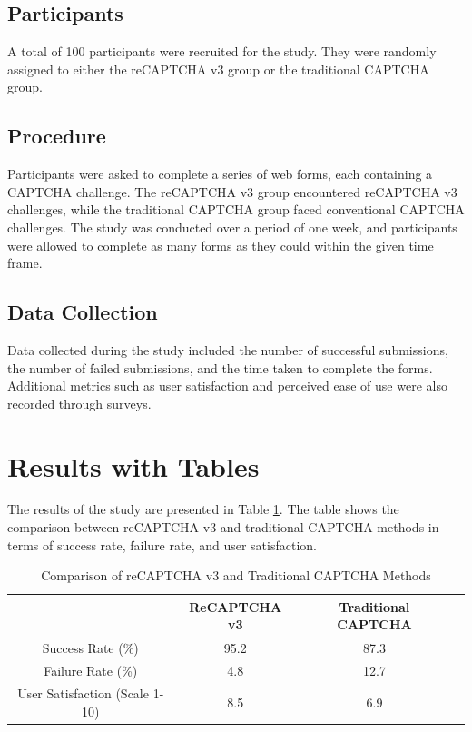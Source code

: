\documentclass{article}
\begin{document}
\subsection{Participants}
A total of 100 participants were recruited for the study. They were randomly assigned to either the reCAPTCHA v3 group or the traditional CAPTCHA group.

\subsection{Procedure}
Participants were asked to complete a series of web forms, each containing a CAPTCHA challenge. The reCAPTCHA v3 group encountered reCAPTCHA v3 challenges, while the traditional CAPTCHA group faced conventional CAPTCHA challenges. The study was conducted over a period of one week, and participants were allowed to complete as many forms as they could within the given time frame.

\subsection{Data Collection}
Data collected during the study included the number of successful submissions, the number of failed submissions, and the time taken to complete the forms. Additional metrics such as user satisfaction and perceived ease of use were also recorded through surveys.

\section{Results with Tables}
The results of the study are presented in Table \ref{tab:results}. The table shows the comparison between reCAPTCHA v3 and traditional CAPTCHA methods in terms of success rate, failure rate, and user satisfaction.

\begin{table}[ht]
\centering
\caption{Comparison of reCAPTCHA v3 and Traditional CAPTCHA Methods}
\label{tab:results}
\begin{tabular}{|c|c|c|c|}
\hline
& ReCAPTCHA v3 & Traditional CAPTCHA \\ \hline
Success Rate (\%) & 95.2 & 87.3 \\ \hline
Failure Rate (\%) & 4.8 & 12.7 \\ \hline
User Satisfaction (Scale 1-10) & 8.5 & 6.9 \\ \hline
\end{tabular}
\end{table}
\end{document}

